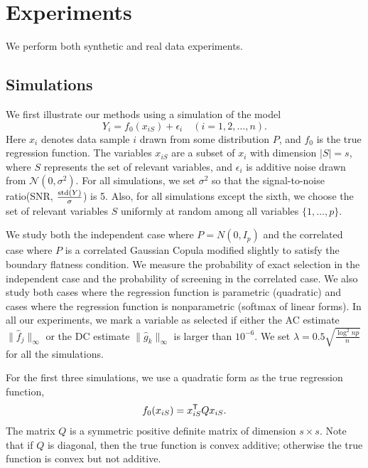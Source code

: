 \def\x{x}
\def\Q{Q}
\def\bds#1{#1}
\def\tts#1{\texttt{\small #1}}

\section{Experiments}
\label{sec:thesims}

We perform both synthetic and real data experiments.

\subsection{Simulations}
We first illustrate our methods using a simulation of the model
\begin{equation}\nonumber
         Y_i = f_0(\x_{iS}) + \epsilon_i \quad (i=1,2,\ldots,n).
\end{equation}
Here $\x_{i}$ denotes data sample $i$ drawn from some distribution
$P$, and $f_0$ is the true regression function. The variables
$\x_{iS}$ are a subset of $\x_i$ with dimension $|S|=s$, where $S$
represents the set of relevant variables, and $\epsilon_i$ is additive
noise drawn from $\mathcal{N}(0,\sigma^2)$. For all simulations, we set
$\sigma^2$ so that the signal-to-noise ratio(SNR,
$\frac{\textrm{std}(Y)}{\sigma}$) is 5. Also, for all simulations except
the sixth, we choose the set of relevant variables $S$ uniformly at
random among all variables $\{1,\ldots,p\}$.

We study both the independent case where $P = N(0, I_p)$ and the
correlated case where $P$ is a correlated Gaussian Copula modified
slightly to satisfy the boundary flatness condition. We measure the
probability of exact selection in the independent case and the
probability of screening in the correlated case. We also study both
cases where the regression function is parametric (quadratic) and
cases where the regression function is nonparametric (softmax of
linear forms). In all our experiments, we mark a variable as selected
if either the AC estimate $\| \hat{f}_j \|_\infty$ or the DC estimate
$\| \hat{g}_k \|_\infty$ is larger than $10^{-6}$. We set $\lambda =
0.5 \sqrt{\frac{\log^2 np}{n}}$ for all the simulations.

For the first three simulations, we use a quadratic form as the true regression function,
\[
f_0(x_{iS}) = x_{iS}^\tran \Q x_{iS}.
\]
The matrix $\Q$ is a symmetric positive definite matrix of dimension $s \times{} s$. 
Note that if $\Q$ is diagonal, then the true function is convex
additive; 
otherwise the true function is convex but not additive.

